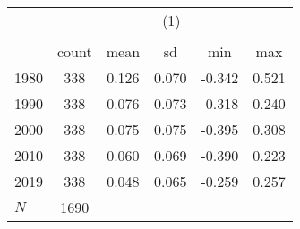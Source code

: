 {
\def\sym#1{\ifmmode^{#1}\else\(^{#1}\)\fi}
\begin{tabular}{l*{1}{ccccc}}
\toprule
            &\multicolumn{5}{c}{(1)}                                         \\
            &\multicolumn{5}{c}{}                                            \\
            &       count&        mean&          sd&         min&         max\\
\midrule
1980        &         338&       0.126&       0.070&      -0.342&       0.521\\
1990        &         338&       0.076&       0.073&      -0.318&       0.240\\
2000        &         338&       0.075&       0.075&      -0.395&       0.308\\
2010        &         338&       0.060&       0.069&      -0.390&       0.223\\
2019        &         338&       0.048&       0.065&      -0.259&       0.257\\
\midrule
\(N\)       &        1690&            &            &            &            \\
\bottomrule
\end{tabular}
}
